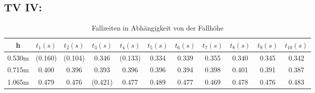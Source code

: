 \documentclass{report}
\begin{document}
\subsection{TV IV:}
    \begin{scriptsize}
    \begin{table}[H]
    \centering
    \caption{Fallzeiten in Abhängigkeit von der Fallhöhe}
    \begin{tabular}{ c||c|c|c|c|c|c|c|c|c|c }
        h & $t_1(s) $ & $t_2(s)$ & $t_3(s)$ & $t_4(s)$ & $t_5(s)$ & $t_6(s)$ & $t_7(s)$ & $t_8(s)$ & $t_9(s)$ & $t_{10}(s)$\\
        \hline
        0.530m & (0.160) & (0.104) & 0.346 & (0.133) & 0.334 & 0.339 & 0.355 & 0.340 & 0.345 & 0.342 \\
        0.715m & 0.400 & 0.396 & 0.393 & 0.396 & 0.396 & 0.394 & 0.398 & 0.401 & 0.391 & 0.387 \\
        1.065m & 0.479 & 0.476 & (0.421) & 0.477 & 0.489 & 0.477 & 0.469 & 0.478 & 0.476 & 0.483 \\
    \end{tabular}
    \end{table}
    \end{scriptsize}
\end{document}
